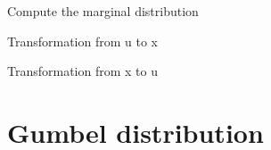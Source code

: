 \documentclass[letterpaper,10pt,english]{sphinxmanual}
\begin{document}
\begin{fulllineitems}
\begin{fulllineitems}
\end{fulllineitems}



\begin{fulllineitems}
Compute the marginal distribution

\end{fulllineitems}



\begin{fulllineitems}
Transformation from u to x

\end{fulllineitems}



\begin{fulllineitems}
Transformation from x to u

\end{fulllineitems}


\end{fulllineitems}



\section{Gumbel distribution}
\label{distributions:gumbel-distribution}
\end{document}
